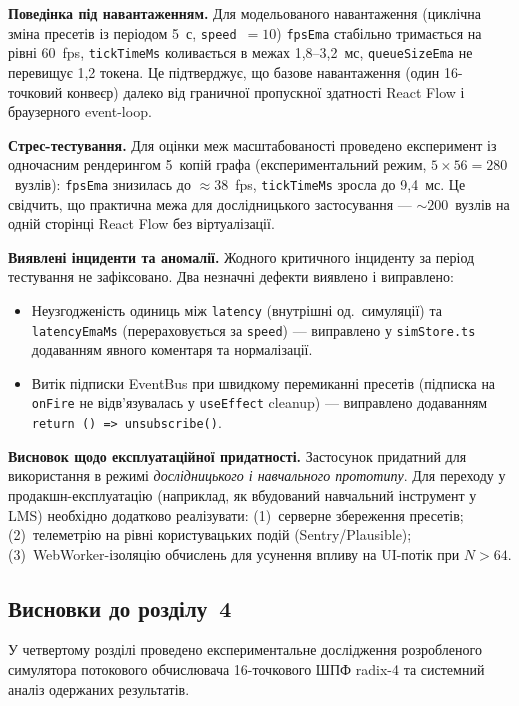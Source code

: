 \textbf{Поведінка під навантаженням.} Для модельованого навантаження
(циклічна зміна пресетів із періодом 5~с, \texttt{speed}~$=10$)
\texttt{fpsEma} стабільно тримається на рівні 60~fps, \texttt{tickTimeMs}
коливається в межах 1,8--3,2~мс, \texttt{queueSizeEma} не перевищує
1,2 токена. Це підтверджує, що базове навантаження (один 16-точковий
конвеєр) далеко від граничної пропускної здатності React Flow і
браузерного event-loop.

\textbf{Стрес-тестування.} Для оцінки меж масштабованості проведено
експеримент із одночасним рендерингом 5~копій графа
(експериментальний режим, $5 \times 56 = 280$~вузлів):
\texttt{fpsEma} знизилась до $\approx 38$~fps, \texttt{tickTimeMs}
зросла до 9,4~мс. Це свідчить, що практична межа для дослідницького
застосування --- $\sim 200$~вузлів на одній сторінці React Flow без
віртуалізації.

\textbf{Виявлені інциденти та аномалії.} Жодного критичного інциденту
за період тестування не зафіксовано. Два незначні дефекти виявлено
і виправлено:

\begin{itemize}
  \item Неузгодженість одиниць між \texttt{latency} (внутрішні од.\
    симуляції) та \texttt{latencyEmaMs} (перераховується за
    \texttt{speed}) --- виправлено у \texttt{simStore.ts} додаванням
    явного коментаря та нормалізації.
  \item Витік підписки EventBus при швидкому перемиканні пресетів
    (підписка на \texttt{onFire} не відв'язувалась у \texttt{useEffect}
    cleanup) --- виправлено додаванням \texttt{return () => unsubscribe()}.
\end{itemize}

\textbf{Висновок щодо експлуатаційної придатності.} Застосунок
придатний для використання в режимі \emph{дослідницького і навчального
прототипу}. Для переходу у продакшн-експлуатацію (наприклад, як
вбудований навчальний інструмент у LMS) необхідно додатково реалізувати:
(1)~серверне збереження пресетів;
(2)~телеметрію на рівні користувацьких подій (Sentry/Plausible);
(3)~WebWorker-ізоляцію обчислень для усунення впливу на UI-потік
при $N > 64$.


\subsection*{Висновки до розділу~4}

У четвертому розділі проведено експериментальне дослідження розробленого
симулятора потокового обчислювача 16-точкового ШПФ radix-4 та системний
аналіз одержаних результатів.


